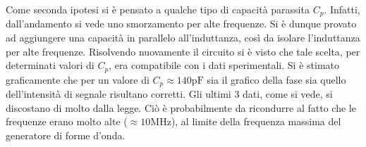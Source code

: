 Come seconda ipotesi si è pensato a qualche tipo di capacità parassita $C_p$. Infatti, dall'andamento si vede uno smorzamento per alte frequenze. Si è dunque provato ad aggiungere una capacità in parallelo all'induttanza, così da isolare l'induttanza per alte frequenze. Risolvendo nuovamente il circuito si è visto che tale scelta, per determinati valori di $C_p$, era compatibile con i dati sperimentali. Si è stimato graficamente che per un valore di $C_p \approx 140 \si{\pico\farad}$ sia il grafico della fase sia quello dell'intensità di segnale risultano corretti. Gli ultimi 3 dati, come si vede, si discostano di molto dalla legge. Ciò è probabilmente da ricondurre al fatto che le frequenze erano molto alte ($\approx 10 \si{\mega\hertz}$), al limite della frequenza massima del generatore di forme d'onda.







